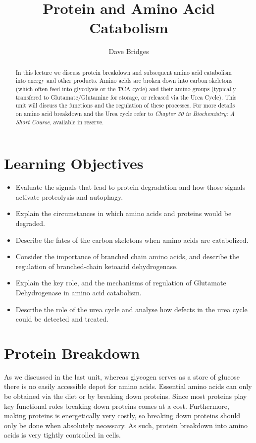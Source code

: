 \documentclass{tufte-handout}
\title{Protein and Amino Acid Catabolism}
\author{Dave Bridges}
\begin{document}
\maketitle%

\begin{abstract}
\noindent In this lecture we discuss protein breakdown and subsequent amino acid catabolism into energy and other products.  Amino acids are broken down into carbon skeletons (which often feed into glycolysis or the TCA cycle) and their amino groups (typically transfered to Glutamate/Glutamine for storage, or released via the Urea Cycle).  This unit will discuss the functions and the regulation of these processes.  For more details on amino acid breakdown and the Urea cycle refer to \emph{Chapter 30 in Biochemistry: A Short Course}, available in reserve\cite{Berg2015}.
\end{abstract}

\tableofcontents

\pagebreak{}
\section{Learning Objectives}

\begin{itemize}
\item Evaluate the signals that lead to protein degradation and how those signals activate proteolysis and autophagy.
\item Explain the circumstances in which amino acids and proteins would be degraded.
\item Describe the fates of the carbon skeletons when amino acids are catabolized.
\item Consider the importance of branched chain amino acids, and describe the regulation of branched-chain ketoacid dehydrogenase.
\item Explain the key role, and the mechanisms of regulation of Glutamate Dehydrogenase in amino acid catabolism.
\item Describe the role of the urea cycle and analyse how defects in the urea cycle could be detected and treated.
\end{itemize}

\section{Protein Breakdown}

As we discussed in the last unit, whereas glycogen serves as a store of glucose there is no easily accessible depot for amino acids.  Essential amino acids can only be obtained via the diet or by breaking down proteins. Since most proteins play key functional roles breaking down proteins comes at a cost.  Furthermore, making proteins is energetically very costly, so breaking down proteins should only be done when absolutely necessary.  As such, protein breakdown into amino acids is very tightly controlled in cells.
\end{document}
